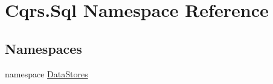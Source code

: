 \hypertarget{namespaceCqrs_1_1Sql}{}\section{Cqrs.\+Sql Namespace Reference}
\label{namespaceCqrs_1_1Sql}
\subsection*{Namespaces}
\begin{DoxyCompactItemize}
\item 
namespace \hyperlink{namespaceCqrs_1_1Sql_1_1DataStores}{Data\+Stores}
\end{DoxyCompactItemize}

